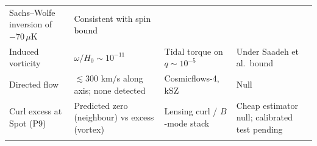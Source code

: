 \documentclass[
]{article}
\begin{document}
\begin{longtable}[]{@{}llll@{}}
\begin{minipage}[t]{0.22\columnwidth}
Sachs--Wolfe inversion of \(-70\,\mu\)K\strut
\end{minipage} & \begin{minipage}[t]{0.22\columnwidth}\raggedright
Consistent with spin bound\strut
\end{minipage}\tabularnewline
\begin{minipage}[t]{0.22\columnwidth}\raggedright
Induced vorticity\strut
\end{minipage} & \begin{minipage}[t]{0.22\columnwidth}\raggedright
\(\omega/H_0 \sim 10^{-11}\)\strut
\end{minipage} & \begin{minipage}[t]{0.22\columnwidth}\raggedright
Tidal torque on \(q \sim 10^{-5}\)\strut
\end{minipage} & \begin{minipage}[t]{0.22\columnwidth}\raggedright
Under Saadeh et al.~bound\strut
\end{minipage}\tabularnewline
\begin{minipage}[t]{0.22\columnwidth}\raggedright
Directed flow\strut
\end{minipage} & \begin{minipage}[t]{0.22\columnwidth}\raggedright
\(\lesssim 300\) km/s along axis; none detected\strut
\end{minipage} & \begin{minipage}[t]{0.22\columnwidth}\raggedright
Cosmicflows-4, kSZ\strut
\end{minipage} & \begin{minipage}[t]{0.22\columnwidth}\raggedright
Null\strut
\end{minipage}\tabularnewline
\begin{minipage}[t]{0.22\columnwidth}\raggedright
Curl excess at Spot (P9)\strut
\end{minipage} & \begin{minipage}[t]{0.22\columnwidth}\raggedright
Predicted zero (neighbour) vs excess (vortex)\strut
\end{minipage} & \begin{minipage}[t]{0.22\columnwidth}\raggedright
Lensing curl / \(B\)-mode stack\strut
\end{minipage} & \begin{minipage}[t]{0.22\columnwidth}\raggedright
Cheap estimator null; calibrated test pending\strut
\end{minipage}\tabularnewline
\begin{minipage}[t]{0.22\columnwidth}\raggedright

\end{minipage}
\end{longtable}
\end{document}
